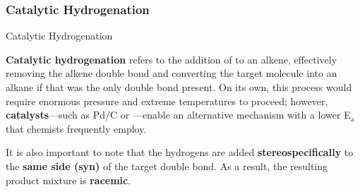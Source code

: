\documentclass[10pt]{article}
\begin{document}
    \subsubsection{Catalytic Hydrogenation}

      \begin{core}[label=core:hydrogenation]{Catalytic Hydrogenation}

        \textbf{Catalytic hydrogenation} refers to the addition of  to an alkene, effectively removing the alkene double bond and converting the target molecule into an alkane if that was the only double bond present. On its own, this process would require enormous pressure and extreme temperatures to proceed; however, \textbf{catalysts}---such as Pd/C or ---enable an alternative mechanism with a lower E$_{\text{a}}$ that chemists frequently employ.


        It is also important to note that the hydrogens are added \textbf{stereospecifically} to the \textbf{same side (syn)} of the target double bond. As a result, the resulting product mixture is \textbf{racemic}.


      \end{core}
\end{document}
